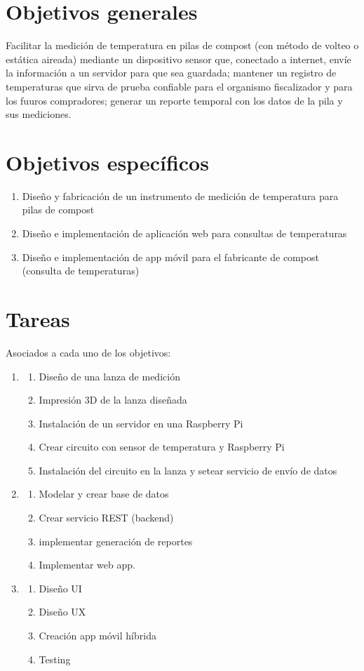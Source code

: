 \documentclass[12pt, letterpaper]{article}
\begin{document}
\section{Objetivos generales}
Facilitar la medición de temperatura en pilas de compost (con método de volteo o estática aireada) mediante un dispositivo sensor que, conectado a internet, envíe la información a un servidor para que sea guardada; mantener un registro de temperaturas que sirva de prueba confiable para el organismo fiscalizador y para los fuuros compradores; generar un reporte temporal con los datos de la pila y sus mediciones.

\section{Objetivos específicos}
\begin{enumerate}
	\item Diseño y fabricación de un instrumento de medición de temperatura para pilas de compost 
	\item Diseño e implementación de aplicación web para consultas de temperaturas
	\item Diseño e implementación de app móvil para el fabricante de compost (consulta de temperaturas)
\end{enumerate}
\section{Tareas}
Asociados a cada uno de los objetivos:
\begin{enumerate}
	\item
	\begin{enumerate}
		\item Diseño de una lanza de medición
		\item Impresión 3D de la lanza diseñada
		\item Instalación de un servidor en una Raspberry Pi
		\item Crear circuito con sensor de temperatura y Raspberry Pi
		\item Instalación del circuito en la lanza y setear servicio de envío de datos
	\end{enumerate}
	\item
	\begin{enumerate}
		\item Modelar y crear base de datos
		\item Crear servicio REST (backend)
		\item implementar generación de reportes
		\item Implementar web app.
	\end{enumerate}
	\item
	\begin{enumerate}
		\item Diseño UI
		\item Diseño UX
		\item Creación app móvil híbrida
		\item Testing
		
	\end{enumerate}
\end{enumerate}
\end{document}
